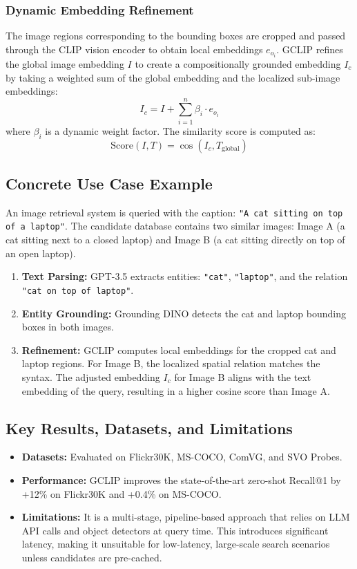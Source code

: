 \documentclass[11pt,a4paper]{article}
\begin{document}
\subsubsection{Dynamic Embedding Refinement}
The image regions corresponding to the bounding boxes are cropped and passed through the CLIP vision encoder to obtain local embeddings $e_{o_i}$. GCLIP refines the global image embedding $I$ to create a compositionally grounded embedding $I_c$ by taking a weighted sum of the global embedding and the localized sub-image embeddings:
\begin{equation}
I_c = I + \sum_{i=1}^n \beta_i \cdot e_{o_i}
\end{equation}
where $\beta_i$ is a dynamic weight factor. The similarity score is computed as:
\begin{equation}
\text{Score}(I, T) = \cos(I_c, T_{\text{global}})
\end{equation}

\subsection{Concrete Use Case Example}
An image retrieval system is queried with the caption: \texttt{"A cat sitting on top of a laptop"}.
The candidate database contains two similar images: Image A (a cat sitting next to a closed laptop) and Image B (a cat sitting directly on top of an open laptop).
\begin{enumerate}
    \item \textbf{Text Parsing:} GPT-3.5 extracts entities: \texttt{"cat"}, \texttt{"laptop"}, and the relation \texttt{"cat on top of laptop"}.
    \item \textbf{Entity Grounding:} Grounding DINO detects the cat and laptop bounding boxes in both images.
    \item \textbf{Refinement:} GCLIP computes local embeddings for the cropped cat and laptop regions. For Image B, the localized spatial relation matches the syntax. The adjusted embedding $I_c$ for Image B aligns with the text embedding of the query, resulting in a higher cosine score than Image A.
\end{enumerate}

\subsection{Key Results, Datasets, and Limitations}
\begin{itemize}
    \item \textbf{Datasets:} Evaluated on Flickr30K, MS-COCO, ComVG, and SVO Probes.
    \item \textbf{Performance:} GCLIP improves the state-of-the-art zero-shot Recall@1 by +12\% on Flickr30K and +0.4\% on MS-COCO.
    \item \textbf{Limitations:} It is a multi-stage, pipeline-based approach that relies on LLM API calls and object detectors at query time. This introduces significant latency, making it unsuitable for low-latency, large-scale search scenarios unless candidates are pre-cached.
\end{itemize}
\end{document}
